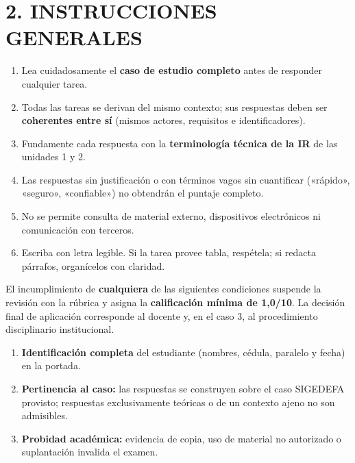 \documentclass[11pt]{article}
\begin{document}
\section*{\textcolor{utegreendk}{2. INSTRUCCIONES GENERALES}}

\begin{enumerate}[leftmargin=18pt,itemsep=2pt]
  \item Lea cuidadosamente el \textbf{caso de estudio completo} antes de responder cualquier tarea.
  \item Todas las tareas se derivan del mismo contexto; sus respuestas deben ser \textbf{coherentes entre sí} (mismos actores, requisitos e identificadores).
  \item Fundamente cada respuesta con la \textbf{terminología técnica de la IR} de las unidades 1 y 2.
  \item Las respuestas sin justificación o con términos vagos sin cuantificar («rápido», «seguro», «confiable») no obtendrán el puntaje completo.
  \item No se permite consulta de material externo, dispositivos electrónicos ni comunicación con terceros.
  \item Escriba con letra legible. Si la tarea provee tabla, respétela; si redacta párrafos, organícelos con claridad.
\end{enumerate}

\begin{tcolorbox}[colback=lightred,colframe=red!60!black,
  title=\textbf{Condiciones de admisión (gatekeeper) --- verificación previa a la calificación},
  fonttitle=\bfseries,boxrule=0.8pt,arc=2mm]
El incumplimiento de \textbf{cualquiera} de las siguientes condiciones suspende la revisión con la rúbrica y asigna la \textbf{calificación mínima de 1{,}0/10}. La decisión final de aplicación corresponde al docente y, en el caso 3, al procedimiento disciplinario institucional.
\begin{enumerate}[leftmargin=18pt,itemsep=2pt]
  \item \textbf{Identificación completa} del estudiante (nombres, cédula, paralelo y fecha) en la portada.
  \item \textbf{Pertinencia al caso:} las respuestas se construyen sobre el caso SIGEDEFA provisto; respuestas exclusivamente teóricas o de un contexto ajeno no son admisibles.
  \item \textbf{Probidad académica:} evidencia de copia, uso de material no autorizado o suplantación invalida el examen.
\end{enumerate}
\end{tcolorbox}
\end{document}
